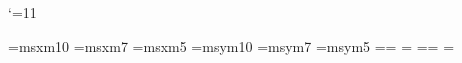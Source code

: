 %

\catcode`\@=11

\font\tenmsx=msxm10
\font\sevenmsx=msxm7
\font\fivemsx=msxm5
\font\tenmsy=msym10
\font\sevenmsy=msym7
\font\fivemsy=msym5
\newfam\msxfam
\newfam\msyfam
\textfont\msxfam=\tenmsx  \scriptfont\msxfam=\sevenmsx
  \scriptscriptfont\msxfam=\fivemsx
\textfont\msyfam=\tenmsy  \scriptfont\msyfam=\sevenmsy
  \scriptscriptfont\msyfam=\fivemsy

\def\hexnumber@#1{\ifcase#1 0\or1\or2\or3\or4\or5\or6\or7\or8\or9\or
	A\or B\or C\or D\or E\or F\fi }

\def\relaxnext@{\let\next\relax}
\def\noaccents@{\def\accentfam@{0}}


\edef\msx@{\hexnumber@\msxfam}
\edef\msy@{\hexnumber@\msyfam}

